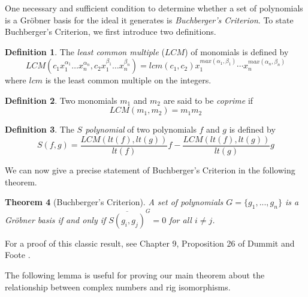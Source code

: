 \documentclass{msthesis}
\newtheorem{theorem}{Theorem}[section]
\theoremstyle{definition}
\newtheorem{definition}[theorem]{Definition}
\begin{document}
One necessary and sufficient condition to determine whether a set of polynomials is a Gr\"obner basis for the ideal it generates is {\em Buchberger's Criterion}.  To state Buchberger’s Criterion, we first introduce two definitions.

\begin{definition}
The \emph{least common multiple} ($LCM$) of monomials is defined by
\[ LCM(c_1x_1^{\alpha_1}\dots x_n^{\alpha_n}, c_2x_1^{\beta_1}\dots x_n^{\beta_n}) = lcm(c_1, c_2)x_1^{max(\alpha_1, \beta_1)} \cdots x_n^{max(\alpha_n, \beta_n)} \]
where $lcm$ is the least common multiple on the integers.
\end{definition}

\begin{definition}
    Two monomials $m_1$ and $m_2$ are said to be \emph{coprime} if
    \[ LCM(m_1, m_2) = m_1m_2 \]
\end{definition}


\begin{definition}
The \emph{$S$ polynomial} of two polynomials $f$ and $g$ is defined by
\[ S(f,g) = \frac{LCM(lt(f), lt(g))}{lt(f)}f - \frac{LCM(lt(f), lt(g))}{lt(g)}g \]
\end{definition}

We can now give a precise statement of Buchberger's Criterion in the following theorem.

\begin{theorem}[Buchberger's Criterion]
    A set of polynomials $G=\{g_1, ..., g_n\}$ is a Gr\"obner basis if and only if $\overline{S(g_i, g_j)}^G = 0$ for all $i \neq j$.
\end{theorem}
For a proof of this classic result, see Chapter 9, Proposition 26 of Dummit and Foote \cite{dummitfoote2003}.

The following lemma is useful for proving our main theorem about the relationship between complex numbers and rig isomorphisms.
\end{document}
